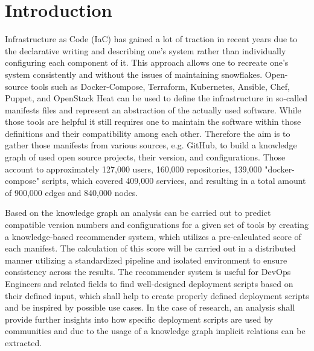 \chapter{Introduction}
Infrastructure as Code (IaC) has gained a lot of traction in recent years due to the declarative writing and describing one's system rather than individually configuring each component of it. This approach allows one to recreate one's system consistently and without the issues of maintaining snowflakes. Open-source tools such as Docker-Compose, Terraform, Kubernetes, Ansible, Chef, Puppet, and OpenStack Heat can be used to define the infrastructure in so-called manifests files and represent an abstraction of the actually used software. While those tools are helpful it still requires one to maintain the software within those definitions and their compatibility among each other.
Therefore the aim is to gather those manifests from various sources, e.g. GitHub, to build a knowledge graph of used open source projects, their version, and configurations. Those account to approximately 127,000 users, 160,000 repositories, 139,000 "docker-compose" scripts, which covered 409,000 services, and resulting in a total amount of 900,000 edges and 840,000 nodes.

Based on the knowledge graph an analysis can be carried out to predict compatible version numbers and configurations for a given set of tools by creating a knowledge-based recommender system, which utilizes a pre-calculated score of each manifest. The calculation of this score will be carried out in a distributed manner utilizing a standardized pipeline and isolated environment to ensure consistency across the results.
The recommender system is useful for DevOps Engineers and related fields to find well-designed deployment scripts based on their defined input, which shall help to create properly defined deployment scripts and be inspired by possible use cases. In the case of research, an analysis shall provide further insights into how specific deployment scripts are used by communities and due to the usage of a knowledge graph implicit relations can be extracted.

